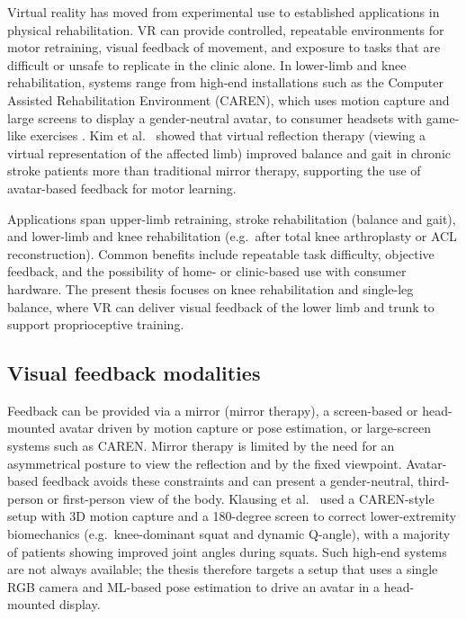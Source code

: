 Virtual reality has moved from experimental use to established applications in physical rehabilitation. VR can provide controlled, repeatable environments for motor retraining, visual feedback of movement, and exposure to tasks that are difficult or unsafe to replicate in the clinic alone. In lower-limb and knee rehabilitation, systems range from high-end installations such as the Computer Assisted Rehabilitation Environment (CAREN), which uses motion capture and large screens to display a gender-neutral avatar, to consumer headsets with game-like exercises \cite{klausing2025feasibility}. Kim et al.\ \cite{kim2020vrrt} showed that virtual reflection therapy (viewing a virtual representation of the affected limb) improved balance and gait in chronic stroke patients more than traditional mirror therapy, supporting the use of avatar-based feedback for motor learning.

Applications span upper-limb retraining, stroke rehabilitation (balance and gait), and lower-limb and knee rehabilitation (e.g.\ after total knee arthroplasty or ACL reconstruction). Common benefits include repeatable task difficulty, objective feedback, and the possibility of home- or clinic-based use with consumer hardware. The present thesis focuses on knee rehabilitation and single-leg balance, where VR can deliver visual feedback of the lower limb and trunk to support proprioceptive training.

\subsection{Visual feedback modalities}

Feedback can be provided via a mirror (mirror therapy), a screen-based or head-mounted avatar driven by motion capture or pose estimation, or large-screen systems such as CAREN. Mirror therapy is limited by the need for an asymmetrical posture to view the reflection and by the fixed viewpoint. Avatar-based feedback avoids these constraints and can present a gender-neutral, third-person or first-person view of the body. Klausing et al.\ \cite{klausing2025feasibility} used a CAREN-style setup with 3D motion capture and a 180-degree screen to correct lower-extremity biomechanics (e.g.\ knee-dominant squat and dynamic Q-angle), with a majority of patients showing improved joint angles during squats. Such high-end systems are not always available; the thesis therefore targets a setup that uses a single RGB camera and ML-based pose estimation to drive an avatar in a head-mounted display.

